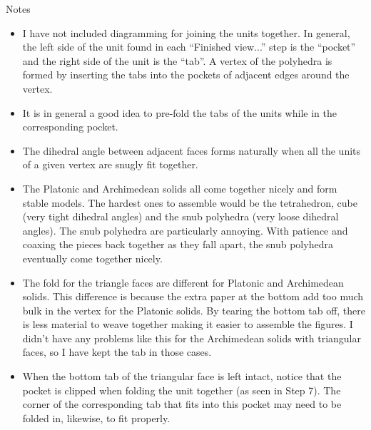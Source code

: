\documentclass[11pt]{article}
\begin{document}
{\Large Notes}
\begin{itemize}
\item I have not included diagramming for joining the units together.  In general, the left side of the unit  found in each ``Finished view...'' step is the ``pocket'' and the right side of the unit is the ``tab''.  A vertex of the polyhedra is formed by inserting the tabs into the pockets of adjacent edges around the vertex.
\item It is in general a good idea to pre-fold the tabs of the units while in the corresponding pocket.
\item The dihedral angle between adjacent faces forms naturally when all the units of a given vertex are snugly fit together.
\item The Platonic and Archimedean solids all come together nicely and form stable models.  The hardest ones to assemble would be the tetrahedron, cube (very tight dihedral angles) and the snub polyhedra (very loose dihedral angles).  The snub polyhedra are particularly annoying.  With patience and coaxing the pieces back together as they fall apart, the snub polyhedra eventually come together nicely.
\item The fold for the triangle faces are different for Platonic and Archimedean solids.  This difference is because the extra paper at the bottom add too much bulk in the vertex for the Platonic solids.  By tearing the bottom tab off, there is less material to weave together making it easier to assemble the figures.  I didn't have any problems like this for the Archimedean solids with triangular faces, so I have kept the tab in those cases.
\item  When the bottom tab of the triangular face is left intact, notice that the pocket is clipped when folding the unit together (as seen in Step 7).  The corner of the corresponding tab that fits into this pocket may need to be folded in, likewise, to fit properly.
\end{itemize}
\end{document}
